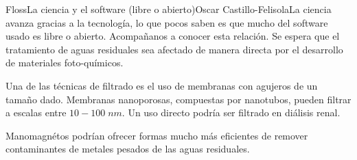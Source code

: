 \begin{Artikel}{Floss}{La ciencia y el software (libre o abierto)}{Oscar Castillo-Felisola}{La ciencia avanza gracias a la tecnolog\'ia, lo que pocos saben es que mucho del software usado es libre o abierto. Acompa\~nanos a conocer esta relaci\'on.}
Se espera que el tratamiento de aguas residuales sea afectado de manera directa por el desarrollo de materiales foto-qu\'imicos.


Una de las t\'ecnicas de filtrado es el uso de membranas con agujeros de un tama\~no dado.  Membranas nanoporosas, compuestas por nanotubos, pueden filtrar a escalas entre $10-100\;nm$. Un uso directo podr\'ia ser filtrado en di\'alisis renal.

Manomagn\'etos podr\'ian ofrecer formas mucho m\'as eficientes de remover contaminantes de metales pesados de las aguas residuales.











\begin{Quellen}
\end{Quellen}

\end{Artikel}

